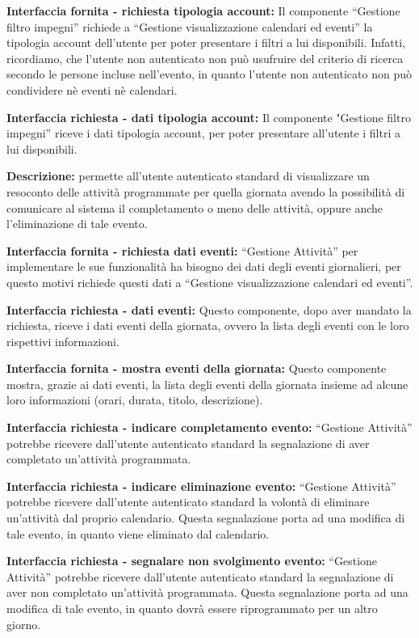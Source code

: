 \begin{listaPersonale}[]{}
    \textbf{Interfaccia fornita - richiesta tipologia account:} Il componente “Gestione filtro impegni” richiede a “Gestione visualizzazione calendari ed eventi”  la tipologia account dell'utente per poter presentare i filtri a lui disponibili. Infatti, ricordiamo, che l'utente non autenticato non può usufruire del criterio di ricerca secondo le persone incluse nell'evento, in quanto l'utente non autenticato non può condividere nè eventi nè calendari.

    \textbf{Interfaccia richiesta - dati tipologia account:} Il componente "Gestione filtro impegni” riceve i dati tipologia account, per poter presentare all'utente i filtri a lui disponibili.



    \textbf{Descrizione:} permette all'utente autenticato standard di visualizzare un resoconto delle attività programmate per quella giornata avendo la possibilità di comunicare al sistema il completamento o meno delle attività, oppure anche l'eliminazione di tale evento.

    \textbf{Interfaccia fornita - richiesta dati eventi:} “Gestione Attività” per implementare le sue funzionalità ha bisogno dei dati degli eventi giornalieri, per questo motivi richiede questi dati a “Gestione visualizzazione calendari ed eventi”.

    \textbf{Interfaccia richiesta - dati eventi:} Questo componente, dopo aver mandato la richiesta, riceve i dati eventi della giornata, ovvero la lista degli eventi con le loro rispettivi informazioni.

    \textbf{Interfaccia fornita - mostra eventi della giornata:} Questo componente mostra, grazie ai dati eventi, la lista degli eventi della giornata insieme ad alcune loro informazioni (orari, durata, titolo, descrizione).

    \textbf{Interfaccia richiesta - indicare completamento evento:} “Gestione Attività” potrebbe ricevere dall'utente autenticato standard la segnalazione di aver completato un'attività programmata.

    \textbf{Interfaccia richiesta - indicare eliminazione evento:} “Gestione Attività” potrebbe ricevere dall'utente autenticato standard la volontà di eliminare un'attività dal proprio calendario. Questa segnalazione porta ad una modifica di tale evento, in quanto viene eliminato dal calendario.

    \textbf{Interfaccia richiesta - segnalare non svolgimento evento:} “Gestione Attività” potrebbe ricevere dall'utente autenticato standard la segnalazione di aver non completato un'attività programmata.  Questa segnalazione porta ad una modifica di tale evento, in quanto dovrà essere riprogrammato per un altro giorno.


\end{listaPersonale}
